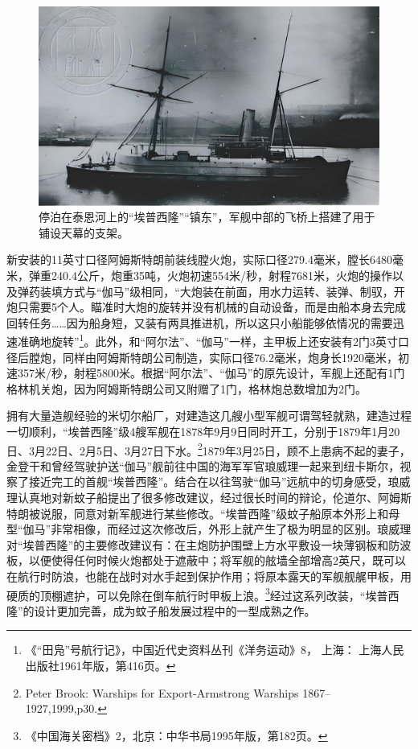 \documentclass[12pt,UTF8]{ctexbook}
\begin{document}
\begin{figure}[htbp]
	\centering
	\includegraphics[width=1\linewidth]{Images/10}
	\caption{停泊在泰恩河上的“埃普西隆”“镇东”，军舰中部的飞桥上搭建了用于铺设天幕的支架。}
	\label{fig:1}
\end{figure}

新安装的11英寸口径阿姆斯特朗前装线膛火炮，实际口径279.4毫米，膛长6480毫米，弹重240.4公斤，炮重35吨，火炮初速554米/秒，射程7681米，火炮的操作以及弹药装填方式与“伽马”级相同，“大炮装在前面，用水力运转、装弹、制驭，开炮只需要5个人。瞄准时大炮的旋转并没有机械的自动设备，而是由船本身去完成回转任务……因为船身短，又装有两具推进机，所以这只小船能够依情况的需要迅速准确地旋转”\footnote{《“田凫”号航行记》，中国近代史资料丛刊《洋务运动》8， 上海： 上海人民出版社1961年版，第416页。}。此外，和“阿尔法”、“伽马”一样，主甲板上还安装有2门3英寸口径后膛炮，同样由阿姆斯特朗公司制造，实际口径76.2毫米，炮身长1920毫米，初速357米/秒，射程5800米。根据“阿尔法”、“伽马”的原先设计，军舰上还配有1门格林机关炮，因为阿姆斯特朗公司又附赠了1门，格林炮总数增加为2门。

拥有大量造舰经验的米切尔船厂，对建造这几艘小型军舰可谓驾轻就熟，建造过程一切顺利，“埃普西隆”级4艘军舰在1878年9月9日同时开工，分别于1879年1月20日、3月22日、2月5日、3月27日下水。\footnote{Peter Brook: Warships for Export-Armstrong Warships 1867--1927,1999,p30.}1879年3月25日，顾不上患病不起的妻子，金登干和曾经驾驶护送“伽马”舰前往中国的海军军官琅威理一起来到纽卡斯尔，视察了接近完工的首舰“埃普西隆”。结合在以往驾驶“伽马”远航中的切身感受，琅威理认真地对新蚊子船提出了很多修改建议，经过很长时间的辩论，伦道尔、阿姆斯特朗被说服，同意对新军舰进行某些修改。“埃普西隆”级蚊子船原本外形上和母型“伽马”非常相像，而经过这次修改后，外形上就产生了极为明显的区别。琅威理对“埃普西隆”的主要修改建议有：在主炮防护围壁上方水平敷设一块薄钢板和防波板，以便使得任何时候火炮都处于遮蔽中；将军舰的舷墙全部增高2英尺，既可以在航行时防浪，也能在战时对水手起到保护作用；将原本露天的军舰舰艉甲板，用硬质的顶棚遮护，可以免除在倒车航行时甲板上浪。\footnote{《中国海关密档》2，北京：中华书局1995年版，第182页。}经过这系列改装，“埃普西隆”的设计更加完善，成为蚊子船发展过程中的一型成熟之作。
\end{document}
